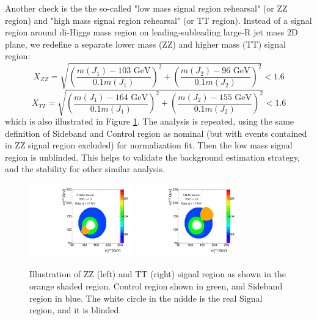 Another check is the the so-called "low mass signal region rehearsal" (or ZZ region) and "high mass signal region rehearsal" (or TT region). Instead of a signal region around di-Higgs mass region on leading-subleading large-R jet mass 2D plane, we redefine a separate lower mass (ZZ) and higher mass (TT) signal region: 
\begin{equation}
X_{ZZ} = \sqrt{\left(\frac{m(J_1) - \text{103 GeV}}{0.1 m(J_1)}\right)^2 + \left(\frac{m(J_2) - \text{96 GeV}}{0.1 m(J_2)}\right)^2} < 1.6 
\label{eq:boosted_Xzz}
\end{equation}
\begin{equation}
X_{TT} = \sqrt{\left(\frac{m(J_1) - \text{164 GeV}}{0.1 m(J_1)}\right)^2 + \left(\frac{m(J_2) - \text{155 GeV}}{0.1 m(J_2)}\right)^2} < 1.6
\label{eq:boosted_Xtt}
\end{equation}
which is also illustrated in Figure \ref{CRSB:ZZIllustration}. The analysis is repeated, using the same definition of Sideband and Control region as nominal (but with events contained in ZZ signal region excluded) for normalization fit. Then the low mass signal region is unblinded. This helps to validate the background estimation strategy, and the stability for other similar analysis.

\begin{figure}[htbp!]
\begin{center}
\includegraphics[width=0.4\textwidth,angle=-90]{figures/boosted/ZZ/Compare_NoTag_mH0H1.pdf}
\includegraphics[width=0.4\textwidth,angle=-90]{figures/boosted/TT/Compare_NoTag_mH0H1.pdf}
\end{center}
\caption{Illustration of ZZ (left) and TT (right) signal region as shown in the orange shaded region. Control region shown in green, and Sideband region in blue. The white circle in the midde is the real Signal region, and it is blinded.}
\label{CRSB:ZZIllustration}
\end{figure}

